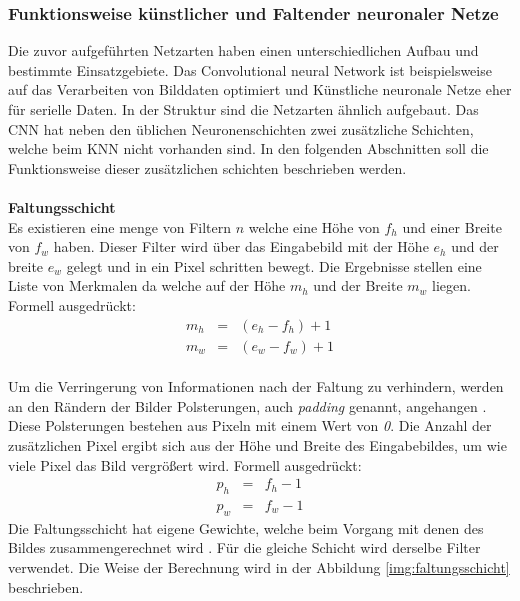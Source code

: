 \documentclass[a4paper,12pt,oneside]{article}
\begin{document}
  \subsubsection{Funktionsweise künstlicher und Faltender neuronaler Netze}\label{s.funktwknnundcnn}
Die zuvor aufgeführten Netzarten haben einen unterschiedlichen Aufbau und bestimmte Einsatzgebiete. Das Convolutional neural Network ist beispielsweise auf das Verarbeiten von Bilddaten optimiert und Künstliche neuronale Netze eher für serielle Daten. In der Struktur sind die Netzarten ähnlich aufgebaut. Das CNN hat neben den üblichen Neuronenschichten zwei zusätzliche Schichten, welche beim KNN nicht vorhanden sind. In den folgenden Abschnitten soll die Funktionsweise dieser zusätzlichen schichten beschrieben werden.\\\\
\textbf{Faltungsschicht}\\
Es existieren eine menge von Filtern $n$ welche eine Höhe von $f_{h}$ und einer Breite von $f_{w}$ haben. Dieser Filter wird über das Eingabebild mit der Höhe $e_{h}$ und der breite $e_{w}$ gelegt und in ein Pixel schritten bewegt. Die Ergebnisse stellen eine Liste von Merkmalen da welche auf der Höhe $m_{h}$ und der Breite $m_{w}$ liegen. Formell ausgedrückt:\\
\begin{eqnarray} 
m_{h}&=&(e_{h} - f_{h})+1\\
m_{w}&=&(e_{w} - f_{w})+1
\end{eqnarray}\\
Um die Verringerung von Informationen nach der Faltung zu verhindern, werden an den Rändern der Bilder Polsterungen, auch \textit{padding} genannt, angehangen \cite[343]{goodfellow2016deep}. Diese Polsterungen bestehen aus Pixeln mit einem Wert von \textit{0}. Die Anzahl der zusätzlichen Pixel ergibt sich aus der Höhe und Breite des Eingabebildes, um wie viele Pixel das Bild vergrößert wird. Formell ausgedrückt:\\
\begin{eqnarray}
p_{h}&=&f_{h} - 1\\
p_{w}&=&f_{w} - 1
\end{eqnarray}
Die Faltungsschicht hat eigene Gewichte, welche beim Vorgang mit denen des Bildes zusammengerechnet wird \cite[331ff.]{goodfellow2016deep}. Für die gleiche Schicht wird derselbe Filter verwendet. Die Weise der Berechnung wird in der Abbildung \ref{img:faltungsschicht}  beschrieben.\\
\end{document}
